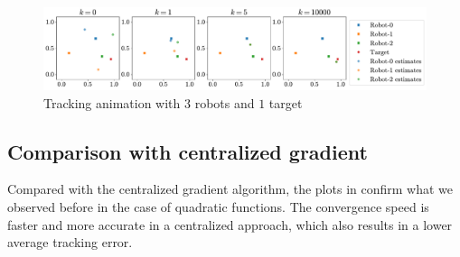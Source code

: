 \documentclass[a4paper,11pt,oneside]{book}
\begin{document}
\begin{figure}[H]
      \centering
      \includegraphics[width=\linewidth]{./figs/tracking/anim.pdf} 
      \caption{Tracking animation with $3$ robots and $1$ target}
      \label{fig:tracking_animation}
\end{figure}


\subsection{Comparison with centralized gradient}

Compared with the centralized gradient algorithm, the plots in  confirm what we observed before in the case of quadratic functions. The convergence speed is faster and more accurate in a centralized approach, which also results in a lower average tracking error.
\end{document}
